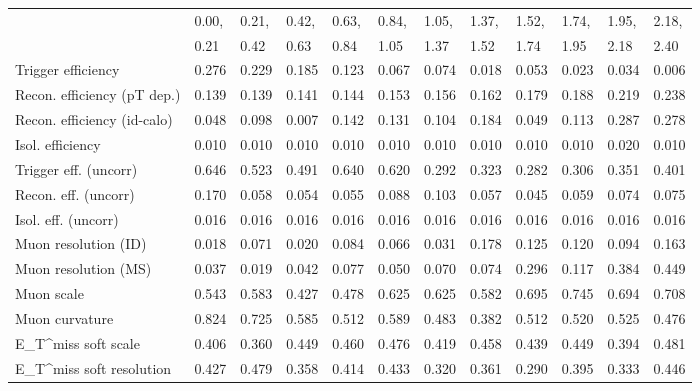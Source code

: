 \begin{tabular}{l|p{0.6cm}p{0.6cm}p{0.6cm}p{0.6cm}p{0.6cm}p{0.6cm}p{0.6cm}p{0.6cm}p{0.6cm}p{0.6cm}p{0.6cm}}
\hline
   & 0.00, & 0.21, & 0.42, & 0.63, & 0.84, & 1.05, & 1.37, & 1.52, & 1.74, & 1.95, & 2.18,  \\ 
   & 0.21 & 0.42 & 0.63 & 0.84 & 1.05 & 1.37 & 1.52 & 1.74 & 1.95 & 2.18 & 2.40  \\ 
\hline
Trigger efficiency                       & 0.276 & 0.229 & 0.185 & 0.123 & 0.067 & 0.074 & 0.018 & 0.053 & 0.023 & 0.034 & 0.006 \\
Recon. efficiency (pT dep.)              & 0.139 & 0.139 & 0.141 & 0.144 & 0.153 & 0.156 & 0.162 & 0.179 & 0.188 & 0.219 & 0.238 \\
Recon. efficiency (id-calo)              & 0.048 & 0.098 & 0.007 & 0.142 & 0.131 & 0.104 & 0.184 & 0.049 & 0.113 & 0.287 & 0.278 \\
Isol. efficiency                         & 0.010 & 0.010 & 0.010 & 0.010 & 0.010 & 0.010 & 0.010 & 0.010 & 0.010 & 0.020 & 0.010 \\
Trigger eff. (uncorr)                    & 0.646 & 0.523 & 0.491 & 0.640 & 0.620 & 0.292 & 0.323 & 0.282 & 0.306 & 0.351 & 0.401 \\
Recon. eff. (uncorr)                     & 0.170 & 0.058 & 0.054 & 0.055 & 0.088 & 0.103 & 0.057 & 0.045 & 0.059 & 0.074 & 0.075 \\
Isol. eff. (uncorr)                      & 0.016 & 0.016 & 0.016 & 0.016 & 0.016 & 0.016 & 0.016 & 0.016 & 0.016 & 0.016 & 0.016 \\
Muon resolution (ID)                     & 0.018 & 0.071 & 0.020 & 0.084 & 0.066 & 0.031 & 0.178 & 0.125 & 0.120 & 0.094 & 0.163 \\
Muon resolution (MS)                     & 0.037 & 0.019 & 0.042 & 0.077 & 0.050 & 0.070 & 0.074 & 0.296 & 0.117 & 0.384 & 0.449 \\
Muon scale                               & 0.543 & 0.583 & 0.427 & 0.478 & 0.625 & 0.625 & 0.582 & 0.695 & 0.745 & 0.694 & 0.708 \\
Muon curvature                           & 0.824 & 0.725 & 0.585 & 0.512 & 0.589 & 0.483 & 0.382 & 0.512 & 0.520 & 0.525 & 0.476 \\
E_{T}^{miss} soft scale                  & 0.406 & 0.360 & 0.449 & 0.460 & 0.476 & 0.419 & 0.458 & 0.439 & 0.449 & 0.394 & 0.481 \\
E_{T}^{miss} soft resolution             & 0.427 & 0.479 & 0.358 & 0.414 & 0.433 & 0.320 & 0.361 & 0.290 & 0.395 & 0.333 & 0.446 \\

\end{tabular}
